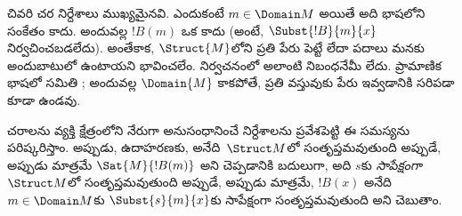 \documentclass[../../../include/open-logic-section]{subfiles}
\begin{document}
\begin{explain}
చివరి  చర
నిర్దేశాలు ముఖ్యమైనవి. ఎందుకంటే $m \in \Domain M$ అయితే అది భాషలోని సంకేతం
కాదు. అందువల్ల $!B(m)$ ఒక  కాదు (అంటే,
$\Subst{!B}{m}{x}$ నిర్వచించబడలేదు). అంతేకాక, $\Struct{M}$లోని ప్రతి
 పేరు పెట్టే  లేదా పదాలు మనకు అందుబాటులో
ఉంటాయని భావించలేం.  నిర్వచనంలో అలాంటి నిబంధనేమీ లేదు.
ప్రామాణిక భాషలో  సమితి ; అందువల్ల
$\Domain{M}$  కాకపోతే, ప్రతి వస్తువుకు పేరు ఇవ్వడానికి
సరిపడా  కూడా ఉండవు.

చరాలను వ్యక్తి క్షేత్రంలోని  నేరుగా అనుసంధానించే
 నిర్దేశాలను ప్రవేశపెట్టి ఈ సమస్యను పరిష్కరిస్తాం. అప్పుడు,
ఉదాహరణకు, 
అనేది~$\Struct M$లో సంతృప్తమవుతుంది అప్పుడే, అప్పుడు మాత్రమే
 $\Sat{M}{!B(m)}$ అని చెప్పడానికి బదులుగా, అది
$s$కు \emph{సాపేక్షంగా}~$\Struct M$లో సంతృప్తమవుతుంది అప్పుడే, అప్పుడు
మాత్రమే, $!B(x)$ అనేది 
$m \in \Domain M$కు $\Subst{s}{m}{x}$కు సాపేక్షంగా సంతృప్తమవుతుంది
అని చెబుతాం.
\end{explain}
\end{document}
